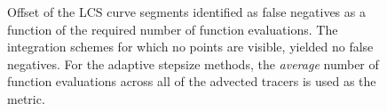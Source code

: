 \begin{figure}[htpb]
    \centering
    
    \caption[Offset of the LCS curve segments identified as false negatives,
    as a function of the required number of function evaluations]
    {Offset of the LCS curve segments identified as false negatives as a
        function of the required number of function evaluations. The
        integration schemes for which no points are visible, yielded
        no false negatives. For the adaptive stepsize methods, the
        \emph{average} number of function evaluations across all of the advected
    tracers is used as the metric.}
    \label{fig:lcs_err_fn_fn}
\end{figure}
